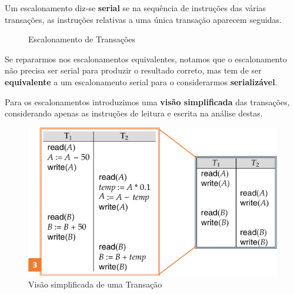 \documentclass[oneside]{book}
\theoremstyle{definition}
\begin{document}
Um escalonamento diz-se \textbf{serial} se na sequência de instruções das várias transações, as instruções relativas a uma única transação aparecem seguidas.

\begin{figure}[H]%
    \centering
    \qquad
    \caption{Escalonamento de Transações}%
    \label{fig:example}%
\end{figure}

Se repararmos nos escalonamentos equivalentes, notamos que o escalonamento não precisa ser serial para produzir o resultado correto, mas tem de ser \textbf{equivalente} a um escalonamento serial para o considerarmos \textbf{serializável}.

Para os escalonamentos introduzimos uma \textbf{visão simplificada} das transações, considerando apenas as instruções de leitura e escrita na análise destas.

\begin{figure}[H]
    \centering
    \includegraphics[scale=0.35]{cap_transct/visao_simplificada.png}
    \caption{Visão simplificada de uma Transação}
\end{figure}
\end{document}
